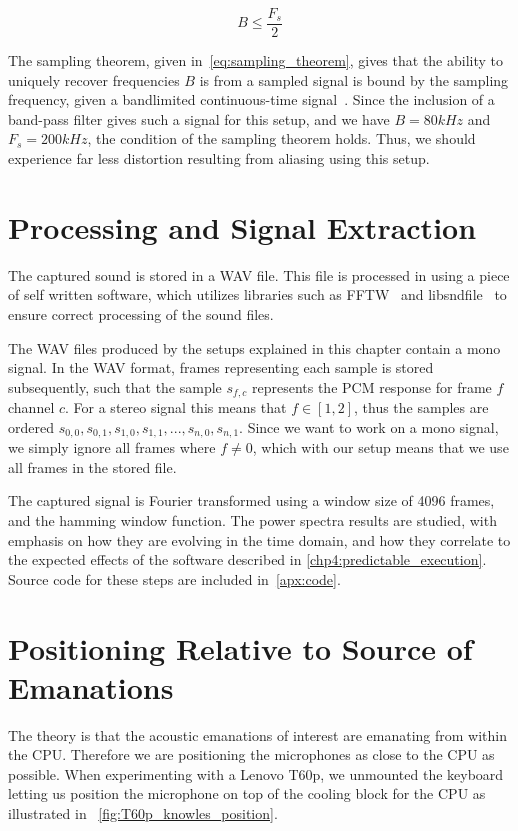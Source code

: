 \begin{equation}\label{eq:sampling_theorem}
B \leq \frac{F_{s}}{2}
\end{equation}

The sampling theorem, given in~\autoref{eq:sampling_theorem}, gives that the ability to uniquely recover frequencies $B$ is from a sampled signal is bound by the sampling frequency, given a bandlimited continuous-time signal~\cite{proakis2007digital}.
Since the inclusion of a band-pass filter gives such a signal for this setup, and we have $B = 80kHz$ and $F_s = 200kHz$, the condition of the sampling theorem holds.
Thus, we should experience far less distortion resulting from aliasing using this setup.


\section{Processing and Signal Extraction}\label{chp3:sec:processing_signal_extraction}
The captured sound is stored in a WAV file.
This file is processed in using a piece of self written software, which utilizes libraries such as FFTW~\cite{url:fftw} and libsndfile~\cite{url:libsndfile} to ensure correct processing of the sound files.

The WAV files produced by the setups explained in this chapter contain a mono signal. 
In the WAV format, frames representing each sample is stored subsequently, such that the sample \( s_{f,c} \) represents the \gls{PCM} response for frame \( f \) channel \( c \). 
For a stereo signal this means that \( f \in \left [ 1, 2 \right ] \), thus the samples are ordered  \( s_{0,0}, s_{0,1}, s_{1,0}, s_{1,1}, ... , s_{n,0}, s_{n,1} \).
Since we want to work on a mono signal, we simply ignore all frames where \( f \neq 0 \), which with our setup means that we use all frames in the stored file.

The captured signal is Fourier transformed using a window size of 4096 frames, and the hamming window function. The power spectra results are studied, with emphasis on how they are evolving in the time domain, and how they correlate to the expected effects of the software described in \autoref{chp4:predictable_execution}.
Source code for these steps are included in~\autoref{apx:code}.

\section{Positioning Relative to Source of Emanations}\label{chp3:sec:capturing_audio_fingerprint}
The theory is that the acoustic emanations of interest are emanating from within the \gls{CPU}.
Therefore we are positioning the microphones as close to the \gls{CPU} as possible. 
When experimenting with a Lenovo T60p, we unmounted the keyboard letting us position the microphone on top of the cooling block for the \gls{CPU} as illustrated in ~\autoref{fig:T60p_knowles_position}.

